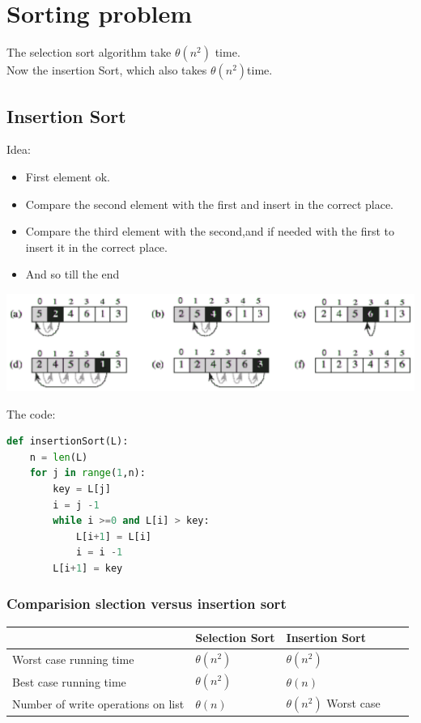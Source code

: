 \documentclass[12pt,oneside]{book}
\begin{document}
\section{Sorting problem}
The selection sort algorithm take $\theta(n^2)$ time.\\
Now the insertion Sort, which also takes $\theta(n^2)$time.\\
\subsection{Insertion Sort}
Idea:
\begin{itemize}
	\item First element ok.
	\item Compare the second element with the first and insert in the correct place.
	\item Compare the third element with the second,and if needed with the first to insert it in the correct place.
	\item And so till the end
\end{itemize}
\begin{center}
	\includegraphics[width=0.4\linewidth]{../pic/python/3.png}
\end{center}
The code:
{\small\begin{lstlisting}[language=python]
def insertionSort(L):
	n = len(L)
	for j in range(1,n):
		key = L[j]
		i = j -1 
		while i >=0 and L[i] > key:
			L[i+1] = L[i]
			i = i -1 
		L[i+1] = key
\end{lstlisting}}
\subsubsection{Comparision slection versus insertion sort}
\begin{center}
	\begin{tabular}{|l|l|l|l|l|}
		\hline
		                                   & Selection Sort & Insertion Sort           \\
		\hline
		Worst case running time            & $\theta(n^2)$  & $\theta(n^2)$            \\
		\hline
		Best case running time             & $\theta(n^2)$  & $\theta(n)$              \\
		\hline
		Number of write operations on list & $\theta(n)$    & $\theta(n^2)$ Worst case \\ \hline
	\end{tabular}
\end{center}
\end{document}
